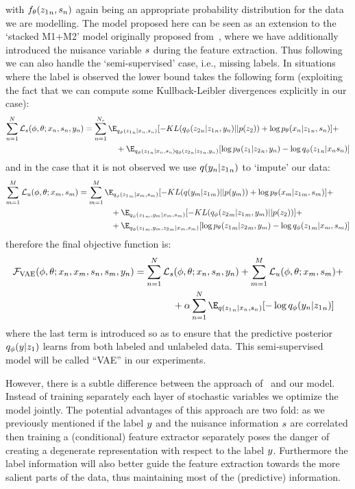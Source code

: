 with $f_\theta({\*z_1}_n, \*s_n)$ again being an appropriate probability distribution for the data we are modelling. The model proposed here can be seen as an extension to the `stacked M1+M2' model originally proposed from~\cite{kingma2014semi}, where we have additionally introduced the nuisance variable $\*s$ during the feature extraction. Thus following~\cite{kingma2014semi} we can also handle the `semi-supervised' case, i.e., missing labels. In situations where the label is observed the lower bound takes the following form (exploiting the fact that we can compute some Kullback-Leibler divergences explicitly in our case):
\begin{align}
\sum_{n=1}^{N}\mathcal{L}_s(\phi, \theta; \*x_n, \*s_n, \*y_n) & =\sum_{n=1}^{N_s} \E_{q_\phi({\*z_1}_n|\*x_n, \*s_n)}[-KL(q_\phi({\*z_2}_n|{\*z_1}_n, \*y_n) || p(\*z_2)) + \log p_\theta(\*x_n|{\*z_1}_n, \*s_n)] +\nonumber\\&\qquad\qquad + \E_{q_\phi({\*z_1}_n|\*x_n, \*s_n)q_\phi({\*z_2}_n|{\*z_1}_n,\*y_n)}[\log p_\theta({\*z_1}|{\*z_2}_n, \*y_n)- \log q_\phi({\*z_1}_n|\*x_n \*s_n)]
\end{align}
and in the case that it is not observed we use $q(\*y_n|{\*z_1}_n)$ to `impute' our data:
\begin{align}
\sum_{m=1}^{M}\mathcal{L}_u(\phi, \theta; \*x_m, \*s_m) & = \sum_{m=1}^{M}\E_{q_\phi({\*z_1}_m|\*x_m,\*s_m)}[ - KL (q(\*y_m|{\*z_1}_m) || p(\*y_m)) + \log p_\theta(\*x_m|{\*z_1}_m, \*s_m)] +\nonumber\\&\qquad\qquad +  \E_{q_\phi({\*z_1}_m, \*y_m|\*x_m,\*s_m)}[ - KL (q_\phi({\*z_2}_m|{\*z_1}_m,\*y_m) || p(\*z_2))] +\nonumber\\&\qquad\qquad+  \E_{q_\phi({\*z_1}_m, \*y_m, {\*z_2}_m|\*x_m, \*s_m)}[\log p_\theta({\*z_1}_m|{\*z_2}_m,\*y_m) -\log q_\phi({\*z_1}_m|\*x_m,\*s_m) ]
\end{align}
therefore the final objective function is:
\begin{align}
    \mathcal{F}_{\text{VAE}}(\phi, \theta; \*x_n, \*x_m, \*s_n, \*s_m, \*y_n) & = \sum_{n=1}^{N}\mathcal{L}_s(\phi, \theta; \*x_n, \*s_n, \*y_n) + \sum_{m=1}^{M}\mathcal{L}_u(\phi, \theta; \*x_m, \*s_m) + \nonumber \\ &\qquad\qquad +  \alpha\sum_{n=1}^{N}\E_{q({\*z_1}_n|\*x_n, \*s_n)}[- \log q_\phi(\*y_n|{\*z_1}_n)]
\end{align}
where the last term is introduced so as to ensure that the predictive posterior $q_\phi(\*y|\*z_1)$ learns from both labeled and unlabeled data. This semi-supervised model will be called ``VAE'' in our experiments.

However, there is a subtle difference between the approach of~\cite{kingma2014semi} and our model. Instead of training separately each layer of stochastic variables we optimize the model jointly. The potential advantages of this approach are two fold: as we previously mentioned if the label $\*y$ and the nuisance information $\*s$ are correlated then training a (conditional) feature extractor separately poses the danger of creating a degenerate representation with respect to the label $\*y$. Furthermore the label information will also better guide the feature extraction towards the more salient parts of the data, thus maintaining most of the (predictive) information.
